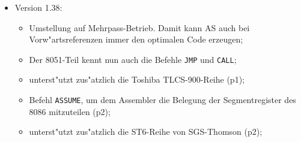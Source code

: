 \documentclass[12pt,a4paper,twoside]{report}
\newcommand{\tty}[1]{{\tt #1}}
\newcommand{\asname}{AS}
\begin{document}
\begin{itemize}
{\begin{itemize}
      \item{P2HEX kann nun auch Hexfiles f"ur 65er-Prozessoren erzeugen;}
      \item{BIND, P2HEX und P2BIN haben jetzt die gleichen
            Variationsm"oglichkeiten in der Kommandozeile wie \asname{};}
      \item{Schalter \tty{i} bei P2HEX, um 3 Varianten f"ur den Ende-Record
            einzustellen;}
      \item{Neue Funktionen \tty{ABS} und \tty{SGN};}
      \item{Neue Pseudovariablen \tty{MOMFILE} und \tty{MOMLINE};}
      \item{Ausgabem"oglichkeit erweiterter Fehlermeldungen;}
      \item{Befehle \tty{IFUSED} und \tty{IFNUSED}, um abzufragen, ob ein
            Symbol bisher benutzt wurde;}
      \item{Die Environment-Variablen \tty{ASCMD}, \tty{BINDCMD} usw. k"onnen auch
            einen Dateinamen enthalten, in dem f"ur die Optionen mehr
            Platz ist;}
      \item{P2HEX erzeugt nun die von Microchip vorgegebenen Hex-Formate
            (p4);}
      \item{mit der Seitenl"angenangabe 0 k"onnen automatische
            Seitenvorsch"ube im Listing vollst"andig unterdr"uckt werden
            (p4);}
      \item{neue Kommandozeilenoption \tty{P}, um die Ausgabe des Makroprozessors
            in eine Datei zu schreiben (p4);}
      \item{in der Kommandozeile definierte Symbole d"urfen nun auch mit
            einem frei w"ahlbaren Wert belegt werden (p5).}
      \end{itemize}}
\item{Version 1.38:
      \begin{itemize}
      \item{Umstellung auf Mehrpass-Betrieb.  Damit kann \asname{} auch bei
            Vorw"artsreferenzen immer den optimalen Code erzeugen;}
      \item{Der 8051-Teil kennt nun auch die Befehle \tty{JMP} und \tty{CALL};}
      \item{unterst"utzt zus"atzlich die Toshiba TLCS-900-Reihe (p1);}
      \item{Befehl \tty{ASSUME}, um dem Assembler die Belegung der
            Segmentregister des 8086 mitzuteilen (p2);}
      \item{unterst"utzt zus"atzlich die ST6-Reihe von SGS-Thomson (p2);}

\end{itemize}}
\end{itemize}
\end{document}
